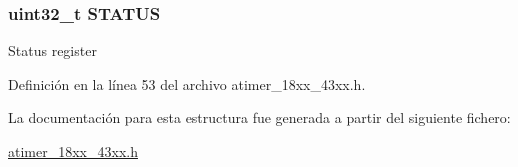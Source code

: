 \subsubsection[{\texorpdfstring{S\+T\+A\+T\+US}{STATUS}}]{ uint32\+\_\+t S\+T\+A\+T\+US}\hypertarget{struct_l_p_c___a_t_i_m_e_r___t_aece2c880dc5ba01a2fc9326dc080dc26}{}\label{struct_l_p_c___a_t_i_m_e_r___t_aece2c880dc5ba01a2fc9326dc080dc26}
Status register 

Definición en la línea 53 del archivo atimer\+\_\+18xx\+\_\+43xx.\+h.



La documentación para esta estructura fue generada a partir del siguiente fichero\+:\begin{DoxyCompactItemize}
\item 
\hyperlink{atimer__18xx__43xx_8h}{atimer\+\_\+18xx\+\_\+43xx.\+h}\end{DoxyCompactItemize}
